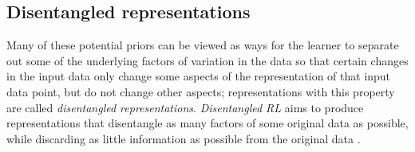         
        
        


    

\subsection{Disentangled representations}\label{sec:Disentangled representations}

Many of these potential priors can be viewed as ways for the learner to separate out some of the underlying factors of variation in the data so that certain changes in the input data only change some aspects of the representation of that input data point, but do not change other aspects; representations with this property are called \textit{disentangled representations}.
\textit{Disentangled RL} aims to produce representations that disentangle as many factors of some original data as possible, while discarding as little information as possible from the original data \autocite{Bengio2013}.

